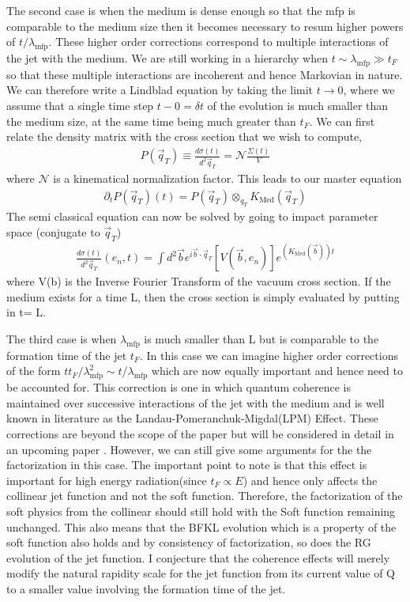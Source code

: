 \documentclass[letter,11pt]{article}
\newcommand{\nn}{\nonumber}
\newcommand{\bea}{\begin{eqnarray}}
\newcommand{\eea}{\end{eqnarray}}
\def\nn{\nonumber}
\begin{document}
The second case is when the medium is dense enough so that the mfp is comparable to the medium size then it becomes necessary to resum higher powers of $t/\lambda_{\text{mfp}}$. These higher order corrections correspond to multiple interactions of the jet with the medium. We are still working in a hierarchy when $ t \sim \lambda_{\text{mfp}} \gg t_F$ so that these multiple interactions are incoherent and hence Markovian in nature. We can therefore write a Lindblad equation by taking the limit $t \rightarrow 0$, where we assume that a single time step $t-0  = \delta t$ of the evolution is much smaller than the medium size, at the same time being much greater than $t_F$. 
We can first relate the density matrix with the cross section that we wish to compute,
\bea
 P(\vec{q}_T) \equiv \frac{d\sigma(t)}{d^2\vec{q}_T} = \mathcal{N}\frac{\Sigma(t)}{V}\nn
\eea
where $\mathcal{N}$ is a kinematical normalization factor. This leads to our master equation
\bea
\partial_tP(\vec{q}_T)(t) = P(\vec{q}_T)\otimes_{q_T} K_{\text{Med}}(\vec{q}_T)
\eea
The semi classical equation can now be solved by going to impact parameter space (conjugate to $\vec{q}_T$)
\bea
\frac{d\sigma(t)}{d^2\vec{q}_T}(e_n,t) = \int d^2\vec{b}e^{i \vec{b}\cdot \vec{q}_T}[V(\vec{b},e_n)]e^{(K_{\text{Med}}(\vec{b}))t}  
\eea
where V(b) is the Inverse Fourier Transform of the vacuum cross section. If the medium exists for a time L, then the cross section is simply evaluated by putting in t= L.

The third case is when $\lambda_{\text{mfp}}$ is much smaller than L but is comparable to the formation time of the jet $t_F$. In this case we can imagine higher order corrections of the form $t t_F/\lambda^2_{\text{mfp}} \sim t/\lambda_{\text{mfp}}$ which are now equally important and hence need to be accounted for. This correction is one in which quantum coherence is maintained over successive interactions of the jet with the medium and is well known in literature as the Landau-Pomeranchuk-Migdal(LPM) Effect. These corrections are beyond the scope of the paper but will be considered in detail in an upcoming paper \cite{Varun}. 
However, we can still give some arguments for the the factorization in this case. The important point to note is that this effect is important for high energy radiation(since $t_F \propto E$) and hence only affects the collinear jet function and not the soft function. Therefore, the factorization of the soft physics from the collinear should still hold with the Soft function remaining unchanged. This also means that the BFKL evolution which is a property of the soft function also holds and by consistency of factorization, so does the RG evolution of the jet function. I conjecture that the coherence effects will merely modify the natural rapidity scale for the jet function from its current value of Q to a smaller value involving the formation time of the jet.
\end{document}

